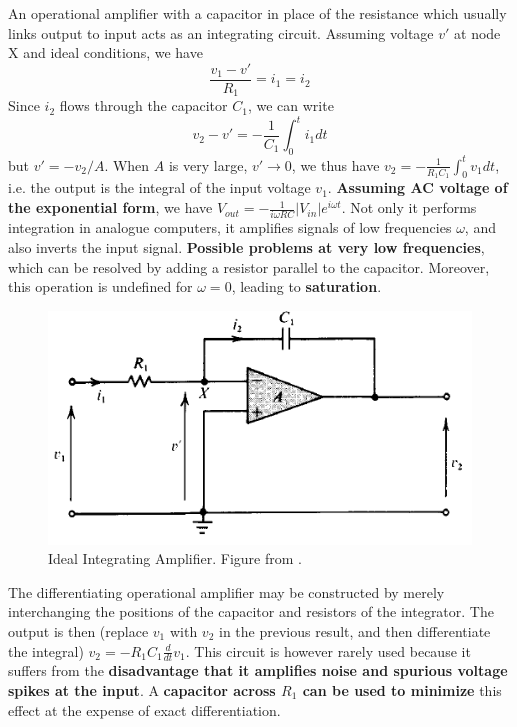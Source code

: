 \documentclass[a4paper]{article}
\begin{document}
\begin{eg}[Integrator]
An operational amplifier with a capacitor in place of the resistance which usually links output to input acts as an integrating circuit. Assuming voltage $v'$ at node X and ideal conditions, we have
$$\frac{v_1-v'}{R_1}=i_1=i_2$$
Since $i_2$ flows through the capacitor $C_1$, we can write
$$v_2-v'=-\frac{1}{C_1}\int_0^ti_1dt$$
but $v'=-v_2/A$. When $A$ is very large, $v'\rightarrow0$, we thus have $v_2=-\frac{1}{R_1C_1}\int_0^tv_1dt$, i.e. the output is the integral of the input voltage $v_1$. \textbf{Assuming AC voltage of the exponential form}, we have $V_{out}=-\frac{1}{i\omega RC}|V_{in}|e^{i\omega t}$. Not only it performs integration in analogue computers, it amplifies signals of low frequencies $\omega$, and also inverts the input signal. \textbf{Possible problems at very low frequencies}, which can be resolved by adding a resistor parallel to the capacitor. Moreover, this operation is undefined for $\omega=0$, leading to \textbf{saturation}.
\end{eg}
\begin{figure}[H]
    \centering
    \includegraphics[scale=0.65]{integratingideal.PNG}
    \caption{Ideal Integrating Amplifier. Figure from \cite{ahmed_spreadbury_1984}.}
    \label{integratingideal}
\end{figure}
\begin{eg}[Differentiator]
The differentiating operational amplifier may be constructed by merely interchanging the positions of the capacitor and resistors of the integrator. The output is then (replace $v_1$ with $v_2$ in the previous result, and then differentiate the integral) $v_2=-R_1C_1\frac{d}{dt}v_1$. This circuit is however rarely used because it suffers from the \textbf{disadvantage that it amplifies noise and spurious voltage spikes at the input}. A \textbf{capacitor across $R_1$ can be used to minimize} this effect at the expense of exact differentiation.
\end{eg}
\end{document}
